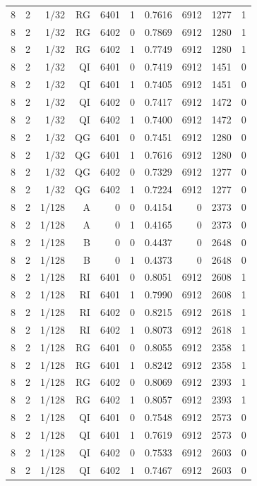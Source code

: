 \begin{longtable}{lrrrrrrrrr}
8 & 2 & 1/32 & RG & 6401 & 1 & 0.7616 & 6912 & 1277 & 1 \\
8 & 2 & 1/32 & RG & 6402 & 0 & 0.7869 & 6912 & 1280 & 1 \\
8 & 2 & 1/32 & RG & 6402 & 1 & 0.7749 & 6912 & 1280 & 1 \\
8 & 2 & 1/32 & QI & 6401 & 0 & 0.7419 & 6912 & 1451 & 0 \\
8 & 2 & 1/32 & QI & 6401 & 1 & 0.7405 & 6912 & 1451 & 0 \\
8 & 2 & 1/32 & QI & 6402 & 0 & 0.7417 & 6912 & 1472 & 0 \\
8 & 2 & 1/32 & QI & 6402 & 1 & 0.7400 & 6912 & 1472 & 0 \\
8 & 2 & 1/32 & QG & 6401 & 0 & 0.7451 & 6912 & 1280 & 0 \\
8 & 2 & 1/32 & QG & 6401 & 1 & 0.7616 & 6912 & 1280 & 0 \\
8 & 2 & 1/32 & QG & 6402 & 0 & 0.7329 & 6912 & 1277 & 0 \\
8 & 2 & 1/32 & QG & 6402 & 1 & 0.7224 & 6912 & 1277 & 0 \\
8 & 2 & 1/128 & A & 0 & 0 & 0.4154 & 0 & 2373 & 0 \\
8 & 2 & 1/128 & A & 0 & 1 & 0.4165 & 0 & 2373 & 0 \\
8 & 2 & 1/128 & B & 0 & 0 & 0.4437 & 0 & 2648 & 0 \\
8 & 2 & 1/128 & B & 0 & 1 & 0.4373 & 0 & 2648 & 0 \\
8 & 2 & 1/128 & RI & 6401 & 0 & 0.8051 & 6912 & 2608 & 1 \\
8 & 2 & 1/128 & RI & 6401 & 1 & 0.7990 & 6912 & 2608 & 1 \\
8 & 2 & 1/128 & RI & 6402 & 0 & 0.8215 & 6912 & 2618 & 1 \\
8 & 2 & 1/128 & RI & 6402 & 1 & 0.8073 & 6912 & 2618 & 1 \\
8 & 2 & 1/128 & RG & 6401 & 0 & 0.8055 & 6912 & 2358 & 1 \\
8 & 2 & 1/128 & RG & 6401 & 1 & 0.8242 & 6912 & 2358 & 1 \\
8 & 2 & 1/128 & RG & 6402 & 0 & 0.8069 & 6912 & 2393 & 1 \\
8 & 2 & 1/128 & RG & 6402 & 1 & 0.8057 & 6912 & 2393 & 1 \\
8 & 2 & 1/128 & QI & 6401 & 0 & 0.7548 & 6912 & 2573 & 0 \\
8 & 2 & 1/128 & QI & 6401 & 1 & 0.7619 & 6912 & 2573 & 0 \\
8 & 2 & 1/128 & QI & 6402 & 0 & 0.7533 & 6912 & 2603 & 0 \\
8 & 2 & 1/128 & QI & 6402 & 1 & 0.7467 & 6912 & 2603 & 0 \\

\end{longtable}
